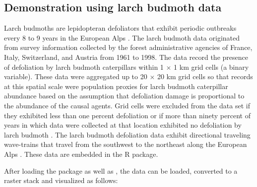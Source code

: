 \hypertarget{demonstration-using-larch-budmoth-data}{%
\subsection{Demonstration using larch budmoth
data}\label{demonstration-using-larch-budmoth-data}}

Larch budmoths are lepidopteran defoliators that exhibit periodic
outbreaks every 8 to 9 years in the European Alps \citep{Bjornstad2002}.
The larch budmoth data originated from survey information collected by
the forest administrative agencies of France, Italy, Switzerland, and
Austria from 1961 to 1998. The data record the presence of defoliation
by larch budmoth caterpillars within 1 \(\times\) 1 km grid cells (a
binary variable). These data were aggregated up to 20 \(\times\) 20 km
grid cells so that records at this spatial scale were population proxies
for larch budmoth caterpillar abundance \citep{Bjornstad2002} based on
the assumption that defoliation damage is proportional to the abundance
of the causal agents. Grid cells were excluded from the data set if they
exhibited less than one percent defoliation or if more than ninety
percent of years in which data were collected at that location exhibited
no defoliation by larch budmoth \citep{Bjornstad2002}. The larch budmoth
defoliation data exhibit directional traveling wave-trains that travel
from the southwest to the northeast along the European Alps
\citep{Bjornstad2002}. These data are embedded in the  R
package.

After loading the  package as well as
, the data can be loaded, converted to a raster
stack and visualized as follows:

